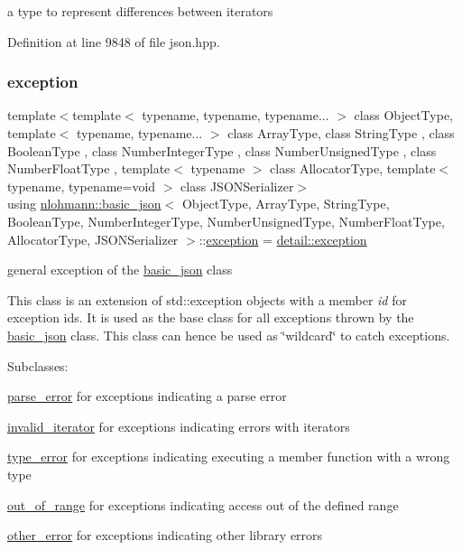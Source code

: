 a type to represent differences between iterators 



Definition at line 9848 of file json.\+hpp.

\mbox{\label{classnlohmann_1_1basic__json_a9a0aced019cb1d65bb49703406c84970}} 
\subsubsection{\texorpdfstring{exception}{exception}}
{\footnotesize\ttfamily template$<$template$<$ typename, typename, typename... $>$ class Object\+Type, template$<$ typename, typename... $>$ class Array\+Type, class String\+Type , class Boolean\+Type , class Number\+Integer\+Type , class Number\+Unsigned\+Type , class Number\+Float\+Type , template$<$ typename $>$ class Allocator\+Type, template$<$ typename, typename=void $>$ class J\+S\+O\+N\+Serializer$>$ \\
using \hyperlink{classnlohmann_1_1basic__json}{nlohmann\+::basic\+\_\+json}$<$ Object\+Type, Array\+Type, String\+Type, Boolean\+Type, Number\+Integer\+Type, Number\+Unsigned\+Type, Number\+Float\+Type, Allocator\+Type, J\+S\+O\+N\+Serializer $>$\+::\hyperlink{classnlohmann_1_1basic__json_a9a0aced019cb1d65bb49703406c84970}{exception} =  \hyperlink{classnlohmann_1_1detail_1_1exception}{detail\+::exception}}



general exception of the \hyperlink{classnlohmann_1_1basic__json}{basic\+\_\+json} class 

This class is an extension of {\ttfamily std\+::exception} objects with a member {\itshape id} for exception ids. It is used as the base class for all exceptions thrown by the \hyperlink{classnlohmann_1_1basic__json}{basic\+\_\+json} class. This class can hence be used as \char`\"{}wildcard\char`\"{} to catch exceptions.

Subclasses\+:
\begin{DoxyItemize}
\item \hyperlink{classnlohmann_1_1basic__json_af1efc2468e6022be6e35fc2944cabe4d}{parse\+\_\+error} for exceptions indicating a parse error
\item \hyperlink{classnlohmann_1_1basic__json_ac13d32f7cbd02d616e71d8dc30dadcbf}{invalid\+\_\+iterator} for exceptions indicating errors with iterators
\item \hyperlink{classnlohmann_1_1basic__json_a4010e8e268fefd86da773c10318f2902}{type\+\_\+error} for exceptions indicating executing a member function with a wrong type
\item \hyperlink{classnlohmann_1_1basic__json_a28f7c2f087274a0012eb7a2333ee1580}{out\+\_\+of\+\_\+range} for exceptions indicating access out of the defined range
\item \hyperlink{classnlohmann_1_1basic__json_a3333a5a8714912adda33a35b369f7b3d}{other\+\_\+error} for exceptions indicating other library errors
\end{DoxyItemize}

